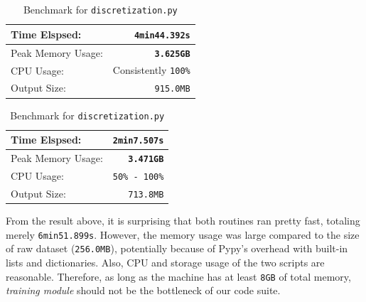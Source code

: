 \documentclass{article} %
\theoremstyle{definition}
\theoremstyle{theorem}
\theoremstyle{remark}
\theoremstyle{remark}
\begin{document}
    \begin{table}[!htbp]
        \begin{minipage}{.5\linewidth}
            \centering
            \begin{tabular}{|l|r|}
                \hline
                Time Elspsed:                           & \texttt{4min44.392s}                      \\ \hline
                Peak Memory Usage:                      & \texttt{\textbf{3.625GB}}               \\ \hline
                CPU Usage:                              & Consistently \texttt{100\%}               \\ \hline
                Output Size:                            & \texttt{915.0MB}               \\ \hline
            \end{tabular}
            \caption{Benchmark for \texttt{statgen.py}}
        \end{minipage}
        \begin{minipage}{.5\linewidth}
            \centering
            \begin{tabular}{|l|r|}
                \hline
                Time Elspsed:                           & \texttt{2min7.507s}                      \\ \hline
                Peak Memory Usage:                      & \texttt{\textbf{3.471GB}}               \\ \hline
                CPU Usage:                              & \texttt{50\% - 100\%}               \\ \hline
                Output Size:                            & \texttt{713.8MB}               \\ \hline
            \end{tabular}
            \caption{Benchmark for \texttt{discretization.py}}
        \end{minipage}
    \end{table}

\par\quad From the result above, it is surprising that both routines ran pretty fast, totaling merely \texttt{6min51.899s}. However, the memory usage was large compared to the size of raw dataset (\texttt{256.0MB}), potentially because of Pypy's overhead with built-in lists and dictionaries. Also, CPU and storage usage of the two scripts are reasonable. Therefore, as long as the machine has at least \texttt{8GB} of total memory, \emph{training module} should not be the bottleneck of our code suite.
\end{document}
